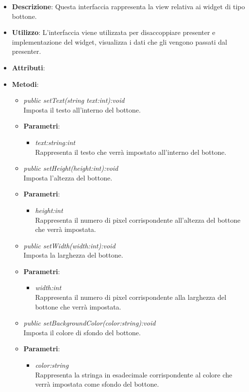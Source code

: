 \begin{itemize}
\item \textbf{Descrizione}: Questa interfaccia rappresenta la view relativa ai widget di tipo bottone.
\item \textbf{Utilizzo}: L'interfaccia viene utilizzata per disaccoppiare presenter e implementazione del widget, visualizza i dati che gli vengono passati dal presenter.
\item \textbf{Attributi}:
\item \textbf{Metodi}:
	\begin{itemize}
	\item \textit{public setText(string text:int):void}\\
	Imposta il testo all'interno del bottone.
		\item{\textbf{Parametri}: \begin{itemize}
		\item \textit{text:string:int}\\
		Rappresenta il testo che verrà impostato all'interno del bottone.
		\end{itemize}}
	\item \textit{public setHeight(height:int):void}\\
	Imposta l'altezza del bottone.
		\item{\textbf{Parametri}: \begin{itemize}
		\item \textit{height:int}\\
		Rappresenta il numero di pixel corrispondente all'altezza del bottone che verrà impostata.
		\end{itemize}}
	\item \textit{public setWidth(width:int):void}\\
	Imposta la larghezza del bottone.
		\item{\textbf{Parametri}: \begin{itemize}
		\item \textit{width:int}\\
		Rappresenta il numero di pixel corrispondente alla larghezza del bottone che verrà impostata.
		\end{itemize}}
	\item \textit{public setBackgroundColor(color:string):void}\\
	Imposta il colore di sfondo del bottone.
		\item{\textbf{Parametri}: \begin{itemize}
		\item \textit{color:string}\\
		Rappresenta la stringa in esadecimale corrispondente al colore che verrà impostata come sfondo del bottone.
		\end{itemize}}
	\end{itemize}
\end{itemize}

